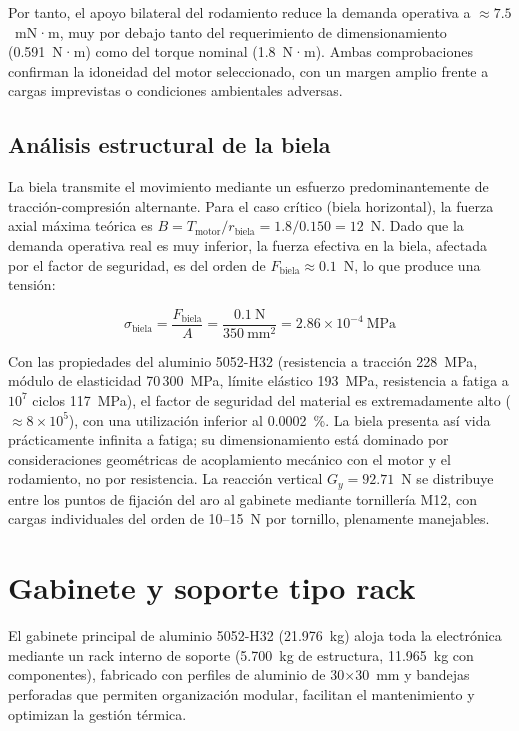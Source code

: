 Por tanto, el apoyo bilateral del rodamiento reduce la demanda operativa a $\approx 7.5$~mN·m, muy por debajo tanto del requerimiento de dimensionamiento (0.591~N·m) como del torque nominal (1.8~N·m). Ambas comprobaciones confirman la idoneidad del motor seleccionado, con un margen amplio frente a cargas imprevistas o condiciones ambientales adversas.

\subsection{Análisis estructural de la biela}\label{subsec:analisis-biela}

La biela transmite el movimiento mediante un esfuerzo predominantemente de tracción-compresión alternante. Para el caso crítico (biela horizontal), la fuerza axial máxima teórica es $B = T_{\text{motor}}/r_{\text{biela}} = 1.8/0.150 = 12$~N. Dado que la demanda operativa real es muy inferior, la fuerza efectiva en la biela, afectada por el factor de seguridad, es del orden de $F_{\text{biela}} \approx 0.1$~N, lo que produce una tensión:

\begin{equation}
\sigma_{\text{biela}} = \frac{F_{\text{biela}}}{A} = \frac{0.1~\text{N}}{350~\text{mm}^2} = 2.86 \times 10^{-4}~\text{MPa}
\end{equation}

Con las propiedades del aluminio 5052-H32 (resistencia a tracción 228~MPa, módulo de elasticidad 70\,300~MPa, límite elástico 193~MPa, resistencia a fatiga a $10^7$ ciclos 117~MPa), el factor de seguridad del material es extremadamente alto ($\approx 8 \times 10^5$), con una utilización inferior al 0.0002~\%. La biela presenta así vida prácticamente infinita a fatiga; su dimensionamiento está dominado por consideraciones geométricas de acoplamiento mecánico con el motor y el rodamiento, no por resistencia. La reacción vertical $G_y = 92.71$~N se distribuye entre los puntos de fijación del aro al gabinete mediante tornillería M12, con cargas individuales del orden de 10--15~N por tornillo, plenamente manejables.

\section{Gabinete y soporte tipo rack}\label{sec:gabinete-rack}

El gabinete principal de aluminio 5052-H32 (21.976~kg) aloja toda la electrónica mediante un rack interno de soporte (5.700~kg de estructura, 11.965~kg con componentes), fabricado con perfiles de aluminio de 30$\times$30~mm y bandejas perforadas que permiten organización modular, facilitan el mantenimiento y optimizan la gestión térmica.

